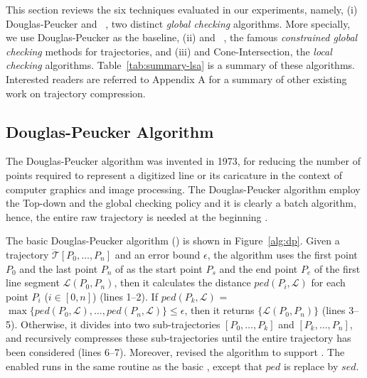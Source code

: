This section reviews the six techniques evaluated in our experiments, namely,
(i) Douglas-Peucker\cite{Douglas:Peucker} and \pavlidis~\cite{Pavlidis:Segment}, two distinct \emph{global checking} algorithms.
More specially, we use Douglas-Peucker as the baseline,
(ii) \bqsa\cite{Liu:BQS} and \squishe~\cite{Muckell:SQUISH}, the famous \emph{constrained global checking} methods for trajectories, %
and (iii) \operb\cite{Lin:Operb} and Cone-Intersection\cite{Williams:Longest,Sklansky:Cone,Dunham:Cone, Zhao:Sleeve}, the \emph{local checking} algorithms.
Table~\ref{tab:summary-lsa} is a summary of these algorithms.
Interested readers are referred to Appendix A for a summary of other existing work on trajectory compression.

\subsection{Douglas-Peucker Algorithm}

The Douglas-Peucker algorithm \cite{Douglas:Peucker} was invented in 1973, for reducing the number of points required to represent a digitized line or its caricature in the context of computer graphics and image processing.
The Douglas-Peucker algorithm employ the Top-down and the global checking policy and it is clearly a batch algorithm, hence, the entire raw trajectory is needed at the beginning \cite{Meratnia:Spatiotemporal}.

The basic Douglas-Peucker algorithm (\dpa) is shown in Figure~\ref{alg:dp}.
Given a trajectory $\dddot{\mathcal{T}}[P_0, \ldots, P_n]$ and an error bound $\epsilon$, the algorithm uses the first point $P_0$ and the last point $P_n$ of  as the start point $P_s$ and the end point $P_e$ of the first line segment $\mathcal{L}(P_0, P_n)$, then it calculates the distance $ped(P_i, {\mathcal{L}})$ for each point $P_i$ ($i\in[0,n]$) (lines 1--2). If $ped(P_k, {\mathcal{L}})$ = $\max \{ped(P_0, {\mathcal{L}}), \ldots, ped(P_n, {\mathcal{L}}) \} \le \epsilon$, then it returns $\{\mathcal{L}(P_0,P_n)\}$ (lines 3--5). Otherwise, it divides  into two sub-trajectories $[P_0, \ldots, P_k]$ and $[P_{k}, \ldots, P_n]$, and recursively compresses these sub-trajectories until the entire trajectory has been considered (lines 6--7).
Moreover, \cite{Meratnia:Spatiotemporal} revised the \dpa algorithm to support \sed.
The \sed enabled \dpa runs in the same routine as the basic \dpa, except that $ped$ is replace by $sed$.

